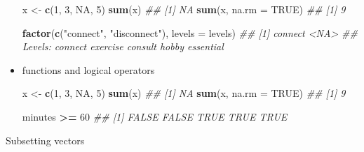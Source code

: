 \documentclass[]{book}
\newenvironment{Shaded}{\begin{snugshade}}{\end{snugshade}}
\newcommand{\CommentTok}[1]{\textcolor[rgb]{0.56,0.35,0.01}{\textit{#1}}}
\newcommand{\DataTypeTok}[1]{\textcolor[rgb]{0.13,0.29,0.53}{#1}}
\newcommand{\DecValTok}[1]{\textcolor[rgb]{0.00,0.00,0.81}{#1}}
\newcommand{\KeywordTok}[1]{\textcolor[rgb]{0.13,0.29,0.53}{\textbf{#1}}}
\newcommand{\NormalTok}[1]{#1}
\newcommand{\OperatorTok}[1]{\textcolor[rgb]{0.81,0.36,0.00}{\textbf{#1}}}
\newcommand{\OtherTok}[1]{\textcolor[rgb]{0.56,0.35,0.01}{#1}}
\newcommand{\StringTok}[1]{\textcolor[rgb]{0.31,0.60,0.02}{#1}}
\begin{document}
\begin{itemize}
\begin{Shaded}
\begin{Highlighting}[]
\NormalTok{x <-}\StringTok{ }\KeywordTok{c}\NormalTok{(}\DecValTok{1}\NormalTok{, }\DecValTok{3}\NormalTok{, }\OtherTok{NA}\NormalTok{, }\DecValTok{5}\NormalTok{)}
\KeywordTok{sum}\NormalTok{(x)}
\CommentTok{## [1] NA}
\KeywordTok{sum}\NormalTok{(x, }\DataTypeTok{na.rm =} \OtherTok{TRUE}\NormalTok{)}
\CommentTok{## [1] 9}

\KeywordTok{factor}\NormalTok{(}\KeywordTok{c}\NormalTok{(}\StringTok{"connect"}\NormalTok{, }\StringTok{"disconnect"}\NormalTok{), }\DataTypeTok{levels =}\NormalTok{ levels)}
\CommentTok{## [1] connect <NA>   }
\CommentTok{## Levels: connect exercise consult hobby essential}
\end{Highlighting}
\end{Shaded}
\item
  functions and logical operators

\begin{Shaded}
\begin{Highlighting}[]
\NormalTok{x <-}\StringTok{ }\KeywordTok{c}\NormalTok{(}\DecValTok{1}\NormalTok{, }\DecValTok{3}\NormalTok{, }\OtherTok{NA}\NormalTok{, }\DecValTok{5}\NormalTok{)}
\KeywordTok{sum}\NormalTok{(x)}
\CommentTok{## [1] NA}
\KeywordTok{sum}\NormalTok{(x, }\DataTypeTok{na.rm =} \OtherTok{TRUE}\NormalTok{)}
\CommentTok{## [1] 9}

\NormalTok{minutes }\OperatorTok{>=}\StringTok{ }\DecValTok{60}
\CommentTok{## [1] FALSE FALSE  TRUE  TRUE  TRUE}
\end{Highlighting}
\end{Shaded}
\end{itemize}

Subsetting vectors
\end{document}
